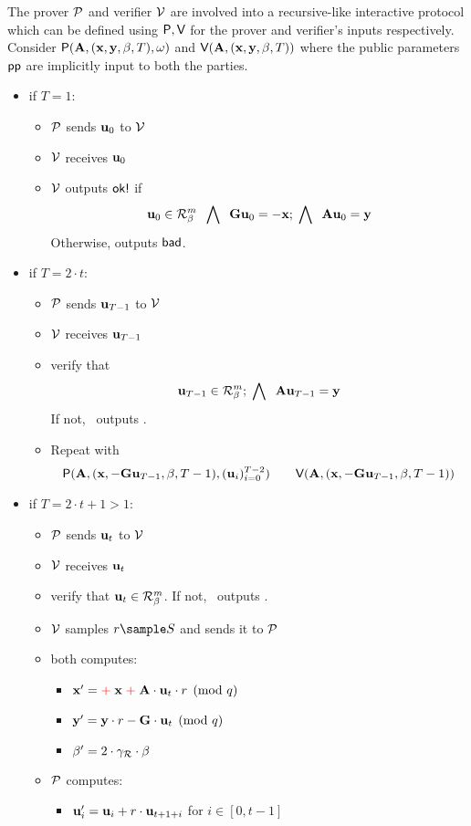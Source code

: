 The prover $\mathcal{P}$ and verifier $\mathcal{V}$ are involved into a recursive-like interactive protocol
which can be defined using $\textsf{P},\textsf{V}$ for the prover and verifier's inputs respectively.
Consider $\prove(\vA,(\vx,\vy,\beta,T), \witness)$ and $\verify(\vA,(\vx,\vy,\beta,T))$ where the
public parameters $\pp$ are implicitly input to both the parties.

\begin{itemize}
	\item if $T = 1$:
	\begin{itemize}
		\item $\mathcal{P}$ sends $\vu[0]$ to $\mathcal{V}$
		\item $\mathcal{V}$ receives $\vu[0]$
		\item $\mathcal{V}$ outputs $\textsf{ok!}$ if
		\[
			\vu[0] \in \Rring[\beta]^{m} \;\;\bigwedge\;\; \vG \vu[0] = -\vx ;\;\bigwedge\;\; \vA \vu[0] = \vy
		\]
			Otherwise, outputs $\textsf{bad}$.
	\end{itemize}
	
	\item if $T = 2 \cdot t$:
	\begin{itemize}
		\item $\mathcal{P}$ sends $\vu[T-1]$ to $\mathcal{V}$
		\item $\mathcal{V}$ receives $\vu[T-1]$
		\item verify that
			\[ \vu[T-1] \in \Rring[\beta]^{m} ;\;\bigwedge\;\; \vA \vu[T-1] = \vy\]
			If not, \advV\ outputs \bad.
		\item Repeat with
			\[
				\prove(\vA,(\vx,- \vG \vu[T-1],\beta,T-1), (\vu[i])_{i=0}^{T-2})
				\qquad \verify(\vA,(\vx,- \vG \vu[T-1],\beta,T-1))
			\]
	\end{itemize}
	
	\item if $T = 2 \cdot t + 1 > 1$:
	\begin{itemize}
		\item $\mathcal{P}$ sends $\vu[t]$ to $\mathcal{V}$
		\item $\mathcal{V}$ receives $\vu[t]$
		\item verify that $\vu[t] \in \Rring[\beta]^{m}$.
			If not, \advV\ outputs \bad.
		\item $\mathcal{V}$ samples $r \sample S$ and sends it to $\mathcal{P}$
		\item both computes:
			\begin{itemize}
				\item $\vx^\prime = \red{+}\; \vx \;\red{+}\; \vA\cdot\vu[t]\cdot r \pmod{q}$
				\item $\vy^\prime = \vy\cdot r - \vG\cdot\vu[t] \pmod{q}$
				\item $\beta^\prime = 2 \cdot \gammaR \cdot \beta$
			\end{itemize}
		\item $\mathcal{P}$ computes:
			\begin{itemize}
				\item $\vu[i]^\prime = \vu[i] + r \cdot \vu[t+1+i]$ for $i \in [0,t-1] $
			\end{itemize}
			

\end{itemize}
\end{itemize}
